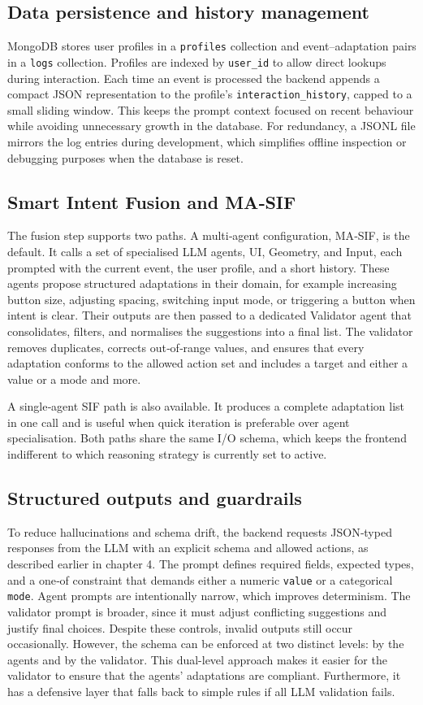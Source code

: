 \documentclass[openany]{book}
\begin{document}
\subsection{Data persistence and history management}
MongoDB stores user profiles in a \texttt{profiles} collection and event–adaptation pairs in a \texttt{logs} collection. Profiles are indexed by \texttt{user\_id} to allow direct lookups during interaction. Each time an event is processed the backend appends a compact JSON representation to the profile’s \texttt{interaction\_history}, capped to a small sliding window. This keeps the prompt context focused on recent behaviour while avoiding unnecessary growth in the database. For redundancy, a JSONL file mirrors the log entries during development, which simplifies offline inspection or debugging purposes when the database is reset.

\subsection{Smart Intent Fusion and MA‑SIF}
The fusion step supports two paths. A multi‑agent configuration, MA‑SIF, is the default. It calls a set of specialised LLM agents, UI, Geometry, and Input, each prompted with the current event, the user profile, and a short history. These agents propose structured adaptations in their domain, for example increasing button size, adjusting spacing, switching input mode, or triggering a button when intent is clear. Their outputs are then passed to a dedicated Validator agent that consolidates, filters, and normalises the suggestions into a final list. The validator removes duplicates, corrects out‑of‑range values, and ensures that every adaptation conforms to the allowed action set and includes a target and either a value or a mode and more.

A single‑agent SIF path is also available. It produces a complete adaptation list in one call and is useful when quick iteration is preferable over agent specialisation. Both paths share the same I/O schema, which keeps the frontend indifferent to which reasoning strategy is currently set to active.

\subsection{Structured outputs and guardrails}
To reduce hallucinations and schema drift, the backend requests JSON‑typed responses from the LLM with an explicit schema and allowed actions, as described earlier in chapter 4. The prompt defines required fields, expected types, and a one‑of constraint that demands either a numeric \texttt{value} or a categorical \texttt{mode}. Agent prompts are intentionally narrow, which improves determinism. The validator prompt is broader, since it must adjust conflicting suggestions and justify final choices. Despite these controls, invalid outputs still occur occasionally. However, the schema can be enforced at two distinct levels: by the agents and by the validator. This dual-level approach makes it easier for the validator to ensure that the agents' adaptations are compliant. Furthermore, it has a defensive layer that falls back to simple rules if all LLM validation fails.
\end{document}
